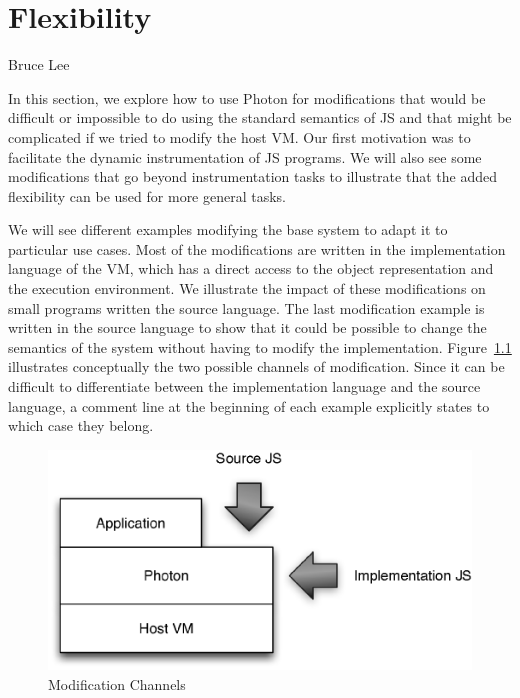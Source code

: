 \chapter{Flexibility}
\label{chap:Flexibility}

{Bruce Lee}

In this section, we explore how to use Photon for modifications that would be
difficult or impossible to do using the standard semantics of JS and that might
be complicated if we tried to modify the host VM. Our first motivation was to
facilitate the dynamic instrumentation of JS programs. We will also see some
modifications that go beyond instrumentation tasks to illustrate that the added
flexibility can be used for more general tasks.

We will see different examples modifying the base system to adapt it to
particular use cases. Most of the modifications are written in the
implementation language of the VM, which has a direct access to the object
representation and the execution environment. We illustrate the impact of these
modifications on small programs written the source language. The last
modification example is written in the source language to show that it could be
possible to change the semantics of the system without having to modify the
implementation. Figure~\ref{fig:ModificationChannels} illustrates conceptually
the two possible channels of modification.  Since it can be difficult to
differentiate between the implementation language and the source language, a
comment line at the beginning of each example explicitly states to which case
they belong.

\begin{figure}[htb]
\begin{center}
\includegraphics{figures/modificationChannels}
\caption{\label{fig:ModificationChannels} Modification Channels}
\end{center}
\end{figure}

